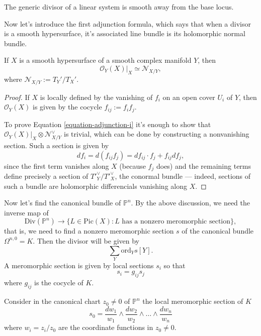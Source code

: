 \documentclass{book}
\begin{document}
\begin{theorem}[Bertini]
\label{theorem-bertini}
The generic divisor of a linear system
is smooth away from the base locus.
\end{theorem}

\medskip\noindent
Now let's introduce the first adjunction
formula,
which says that when a divisor is a smooth
hypersurface,
it's associated line bundle is its
holomorphic normal bundle.

\begin{theorem}
\label{theorem-adjunction-formula-i}
\begin{reference}
\cite[p.146]{GH}
\end{reference}
If $X$ is a smooth hypersurface of a smooth
complex manifold $Y$, then
\begin{equation}
\label{equation-adjunction-i}
\mathcal{O}_Y(X)|_{X} \simeq
\mathcal{N}_{X/Y},
\end{equation}
where $\mathcal{N}_{X/Y}:=T_Y'/T_X'$.
\end{theorem}

\begin{proof}
If $X$ is locally defined
by the vanishing of $f_i$ on an open cover
$U_i$ of $Y$,
then $\mathcal{O}_Y(X)$ is given by the
cocycle $f_{ij}:=f_if_j$.

To prove Equation \ref{equation-adjunction-i}
it's enough to show that
$\mathcal{O}_Y(X)|_{X}\otimes
\mathcal{N}^\vee_{X/Y}$
is trivial, which can be done by constructing
a nonvanishing section.
Such a section is given by
$$
df_i=d(f_{ij}f_j)=df_{ij}\cdot
f_j+f_{ij}df_j,
$$
since the first term vanishes along $X$
(because $f_j$ does)
and the remaining terms define precisely a
section
of ${T'}^\vee_Y/{T'}^\vee_X$,
the conormal bundle ---
indeed, sections of such a bundle
are holomorphic differencials vanishing along
$X$.
\end{proof}

\noindent
Now let's find the canonical bundle of
$\mathbb{P}^n$.
By the above discussion, we need the inverse
map of
$$
\text{Div}(\mathbb{P}^n) \to \{L \in
\text{Pic}(X):
\text{$L$ has a nonzero meromorphic
section}\},
$$
that is, we need to find a nonzero
meromorphic section $s$
of the canonical bundle $\Omega^{n,0}=K$.
Then the divisor will be given by
$$
\sum_Y \text{ord}_Ys [Y].
$$
A meromorphic section is given by local
sections $s_i$
so that
$$
s_i=g_{ij}s_j
$$
where $g_{ij}$ is the cocycle of $K.$

Consider in the canonical chart $z_0\neq 0$
of $\mathbb{P}^n$
the local meromorphic section of $K$
$$
s_0=
\frac{dw_1}{w_1}\wedge\frac{dw_2}{w_2}\wedge…
\wedge\frac{dw_n}{w_n}
$$
where $w_i=z_i/z_0$ are the coordinate
functions in $z_0\neq 0$.
\end{document}
